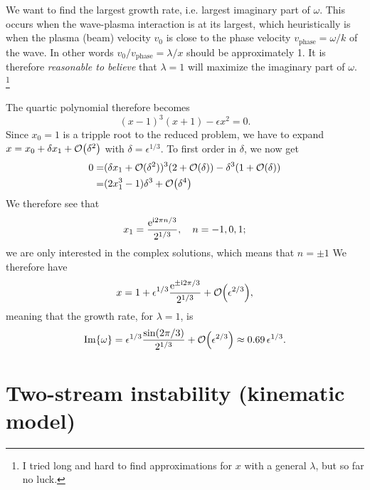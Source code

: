 \documentclass[11pt,a4paper, 
swedish, english %
]{article}
\begin{document}
We want to find the largest growth rate, i.e. largest imaginary part
of $\omega$. This occurs when the wave-plasma interaction is at its
largest, which heuristically is when the plasma (beam) velocity $v_0$
is close to the phase velocity $v_\text{phase}=\omega/k$ of the
wave. In other words $v_0/v_\text{phase}=\lambda/x$ should be
approximately 1. It is therefore \emph{reasonable to believe} that
$\lambda=1$ will maximize the imaginary part of $\omega$.
\footnote{I tried long and hard to find approximations for $x$ with a
  general $\lambda$, but so far no luck. }

The quartic polynomial therefore becomes
\begin{equation}
(x-1)^3(x+1)-\epsilon x^2=0.
\end{equation}
Since $x_0=1$ is a tripple root to the reduced problem, we have to
expand $x=x_0+\delta x_1+\order{\delta^2}$ with
$\delta=\epsilon^{1/3}$. To first order in $\delta$, we now get
\begin{equation}
\begin{aligned}
0=&(\delta x_1+\order*{\delta^2})^3(2+\order{\delta})
-\delta^3(1+\order{\delta})\\
=&(2x_1^3-1)\delta^3 + \order{\delta^4}
\end{aligned}
\end{equation}
We therefore see that
\begin{equation}
x_1 = \frac{\ee^{\ii 2\pi n/3}}{2^{1/3}}\qc n=-1, 0, 1;
\end{equation}
we are only interested in the complex solutions, which means that $n=\pm1$
We therefore have\footnotemark{}
\begin{equation}
x=1+\epsilon^{1/3}\frac{\ee^{\pm\ii2\pi/3}}{2^{1/3}}
+\order{\epsilon^{2/3}},
\end{equation}
meaning that the growth rate, for $\lambda=1$, is
\begin{equation}
\Im{\omega} =
\epsilon^{1/3}\frac{\sin(2\pi/3)}{2^{1/3}}+\order{\epsilon^{2/3}}
\approx 0.69\,\epsilon^{1/3}.
\end{equation}




\section{Two-stream instability (kinematic model)}




\end{document}
